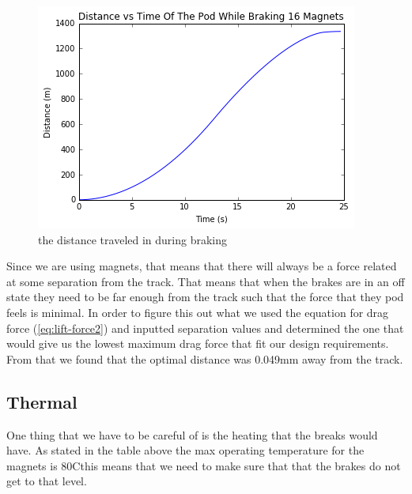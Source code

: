 \documentclass[main.tex]{subfiles}
\begin{document}
    \begin{figure}
        \centering
        \includegraphics[width=\linewidth]{images/totaldistanceprofile}
        \caption{the distance traveled in during braking}
        \label{fig:distance-profile}
    \end{figure}
    
    Since we are using magnets, that means that there will always be a force related at some separation from the track. That means that when the brakes are in an off state they need to be far enough from the track such that the force that they pod feels is minimal. In order to figure this out what we used the equation for drag force (\ref{eq:lift-force2}) and inputted separation values and determined the one that would give us the lowest maximum drag force that fit our design requirements. From that we found that the optimal distance was 0.049mm away from the track.    
    
 
    \subsection{Thermal}
    One thing that we have to be careful of is the heating that the breaks would have. As stated in the table above the max operating temperature for the magnets is $80$C\textdegree this means that we need to make sure that that the brakes do not get to that level.\\
\end{document}
